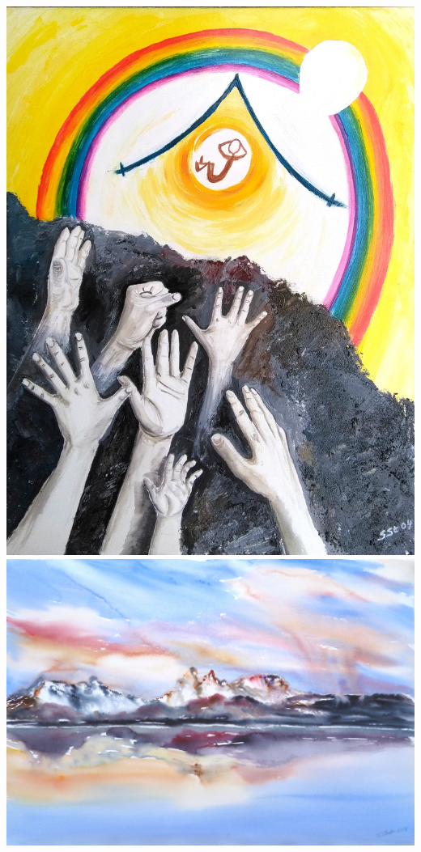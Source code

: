 \documentclass[a4paper,twoside, svgnames]{article}
\begin{document}
\newpage
\begin{center}
\includegraphics[width=\linewidth]{images/susanne/b2_derherristmeinlicht}\\
\vspace*{1cm}
\includegraphics[width=\linewidth]{images/susanne/lagoconmontitramonto}
\end{center}
\end{document}

